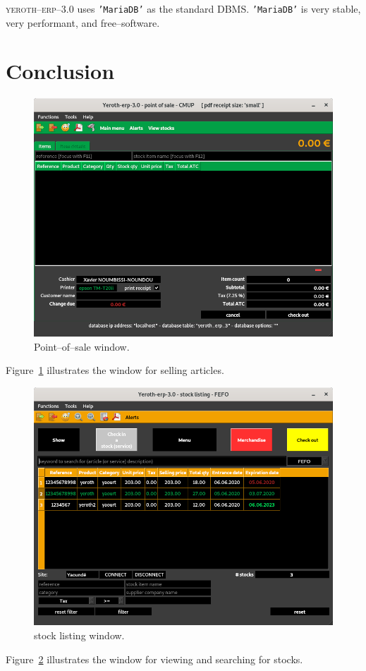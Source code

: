 \documentclass[a4paper, 10pt, twocolumn]{article}
\newcommand{\yeren}{\textsc{yeroth--erp--3.0}\xspace}
\newcommand{\mariadb}{\texttt{'MariaDB'}\xspace}
\begin{document}
\yeren uses \mariadb as the standard DBMS. 
\mariadb is very stable, very performant,
and free--software.
\vspace{-0.3em}
\section{Conclusion}
\vspace{-0.3em}
\begin{figure}[!htbp]
\centering
\includegraphics[scale=0.33]{../../francais/images/yeren-pos-7-0-window-cashier.png}
\caption{Point--of--sale window.}
\label{fig:fenetre-de-vente}
\end{figure}

\vspace{-0.5em}

Figure~\ref{fig:fenetre-de-vente} illustrates
the window for selling articles.

\begin{figure}[!htbp]
\centering
\includegraphics[scale=0.33]{images/yeroth-stock-listing-window.png}
\caption{stock listing window.}
\label{fig:fenetre-de-stock}
\end{figure}

Figure~\ref{fig:fenetre-de-stock} illustrates
the window for viewing and searching for stocks.
\end{document}

